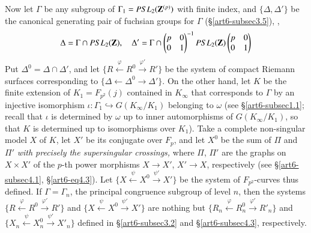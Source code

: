 Now let $\Gamma$ be any subgroup of $\Gamma_1 = PSL_2 (\mathbf{Z}^{(p)})$ with finite index, and $\{\Delta, \Delta'\}$ be the canonical generating pair of fuchsian groups for $\Gamma$ (\S \eqref{art6-subsec3.5}), \ie,
\begin{equation}
\Delta = \Gamma \cap PSL_2 (\mathbf{Z}), \quad \Delta' = \Gamma \cap 
\begin{pmatrix}
p &0\\
0 & 1
\end{pmatrix}^{-1}
PSL_2  (\mathbf{Z}) 
\begin{pmatrix}
p&0\\
0&1
\end{pmatrix}\label{art6-eq5.1.4}
\end{equation}
Put $\Delta^0 = \Delta \cap \Delta'$, and let $\{R \xleftarrow{\varphi} R^0 \xrightarrow{\varphi'} R'\}$ be the system of compact Riemann surfaces corresponding to $\{\Delta \leftarrow\Delta^0 \to \Delta'\}$. On the other hand, let $K$ be the finite extension of $K_1 = F_{p^2} (j)$ contained in $K_\infty$ that corresponds to $\Gamma$ by an injective isomorphism $\iota: \Gamma_1 \hookrightarrow G (K_\infty/K_1)$ belonging to $\omega$ (see \S \ref{art6-subsec1.1}; recall that $\iota$ is determined by $\omega$ up to inner automorphisms of $G(K_\infty/K_1)$, so that $K$ is determined up to isomorphisms over $K_1$). Take a complete non-singular model $X$ of $K$, let $X'$ be its conjugate over $F_p$, and let $X^0$ be the sum of $\Pi$ and $\Pi'$ \textit{with precisely the supersingular crossings,}  where $\Pi$, $\Pi'$ are the graphs on $X \times X'$ of the $p$-th power morphisms $X \to X'$, $X' \to X$, respectively (see \S \ref{art6-subsec4.1}, \S \ref{art6-eq4.3}). Let $\{X \xleftarrow{\psi} X^0 \xrightarrow{\psi'} X'\}$  be the  system of $F_{p^2}$-curves thus defined. If $\Gamma = \Gamma_n$, the principal congruence subgroup of level $n$, then the systems $\{R \xleftarrow{\varphi} R^0 \xrightarrow{\varphi'} R'\}$ and $\{X \xleftarrow{\psi} X^0 \xrightarrow{\psi'} X'\}$ are nothing but $\{R_n \xleftarrow{\varphi} R^0_n \xrightarrow{\varphi'} R'_n\}$ and $\{X_n \xleftarrow{\psi} X^0_n \xrightarrow{\psi'} X'_n\}$ defined in \S \ref{art6-subsec3.2} and \S \ref{art6-subsec4.3}, respectively.

